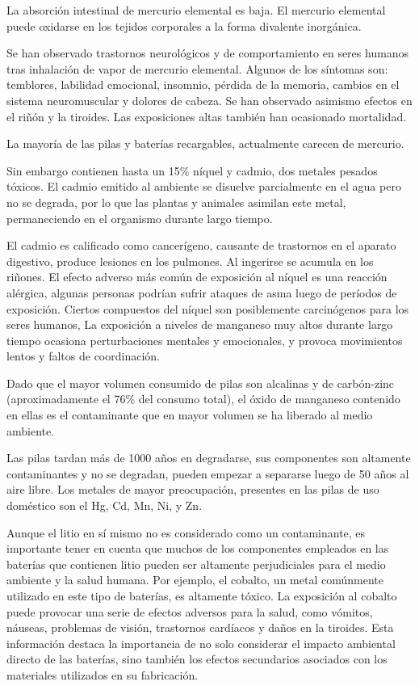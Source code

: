                 La absorción intestinal de mercurio elemental es baja. El mercurio elemental puede oxidarse en los tejidos corporales a la forma divalente inorgánica.\par
                Se han observado trastornos neurológicos y de comportamiento en seres humanos tras inhalación de vapor de mercurio elemental. Algunos de los síntomas son: temblores, labilidad emocional, insomnio, pérdida de la memoria, cambios en el sistema neuromuscular y dolores de cabeza. Se han observado asimismo efectos en el riñón y la tiroides. Las exposiciones altas también han ocasionado mortalidad.\par
                La mayoría de las pilas y baterías recargables, actualmente carecen de mercurio.\par
                Sin embargo contienen hasta un 15\% níquel y cadmio, dos metales pesados tóxicos. El cadmio emitido al ambiente se disuelve parcialmente en el agua pero no se degrada, por lo que las plantas y animales asimilan este metal, permaneciendo en el organismo durante largo tiempo.\par
                El cadmio es calificado como cancerígeno, causante de trastornos en el aparato digestivo, produce lesiones en los pulmones. Al ingerirse se acumula en los riñones. El efecto adverso más común de exposición al níquel es una reacción alérgica, algunas personas podrían sufrir ataques de asma luego de períodos de exposición. Ciertos compuestos del níquel son posiblemente carcinógenos para los seres humanos, La exposición a niveles de manganeso muy altos durante largo tiempo ocasiona perturbaciones mentales y emocionales, y provoca movimientos lentos y faltos de coordinación.\par
                Dado que el mayor volumen consumido de pilas son alcalinas y de carbón-zinc (aproximadamente el 76\% del consumo total), el óxido de manganeso contenido en ellas es el contaminante que en mayor volumen se ha liberado al medio ambiente.\par
                Las pilas tardan más de 1000 años en degradarse, sus componentes son altamente contaminantes y no se degradan, pueden empezar a separarse luego de 50 años al aire libre. Los metales de mayor preocupación, presentes en las pilas de uso doméstico son el Hg, Cd, Mn, Ni, y Zn.\par 
                Aunque el litio en sí mismo no es considerado como un contaminante, es importante tener en cuenta que muchos de los componentes empleados en las baterías que contienen litio pueden ser altamente perjudiciales para el medio ambiente y la salud humana. Por ejemplo, el cobalto, un metal comúnmente utilizado en este tipo de baterías, es altamente tóxico. La exposición al cobalto puede provocar una serie de efectos adversos para la salud, como vómitos, náuseas, problemas de visión, trastornos cardíacos y daños en la tiroides. Esta información destaca la importancia de no solo considerar el impacto ambiental directo de las baterías, sino también los efectos secundarios asociados con los materiales utilizados en su fabricación.\par
                            
